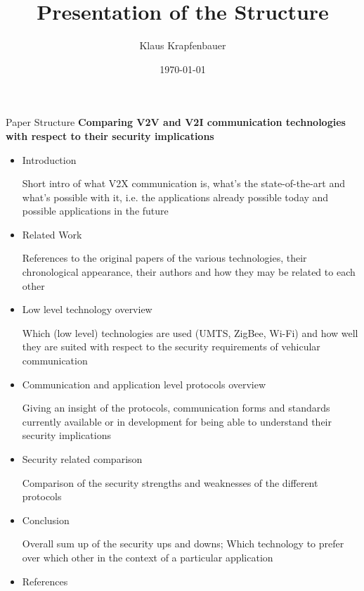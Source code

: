 \documentclass[]{beamer} %
\title{Presentation of the Structure}
\author{Klaus Krapfenbauer}
\date{\today}
\begin{document}
\maketitle


\begin{frame}[allowframebreaks]{Paper Structure}
	\textbf{Comparing V2V and V2I communication technologies with respect to their security implications}

	\begin{itemize}
		\item Introduction
	
			Short intro of what V2X communication is, what's the state-of-the-art
			and what's possible with it, i.e. the applications already possible today and
			possible applications in the future

		\item Related Work

			References to the original papers of the various technologies, their
			chronological appearance, their authors and how they may be related to each other

		\item Low level technology overview

			Which (low level) technologies are used (UMTS, ZigBee, Wi-Fi) and how well
			they are suited with respect to the security requirements of vehicular
			communication

		\item Communication and application level protocols overview

			Giving an insight of the protocols, communication forms and standards
			currently available or in development for being able to understand
			their security implications

		\item Security related comparison

			Comparison of the security strengths and weaknesses of the different protocols

		\item Conclusion

			Overall sum up of the security ups and downs; Which technology to prefer over
			which other in the context of a particular application

		\item References
	\end{itemize}
\end{frame}
\end{document}
